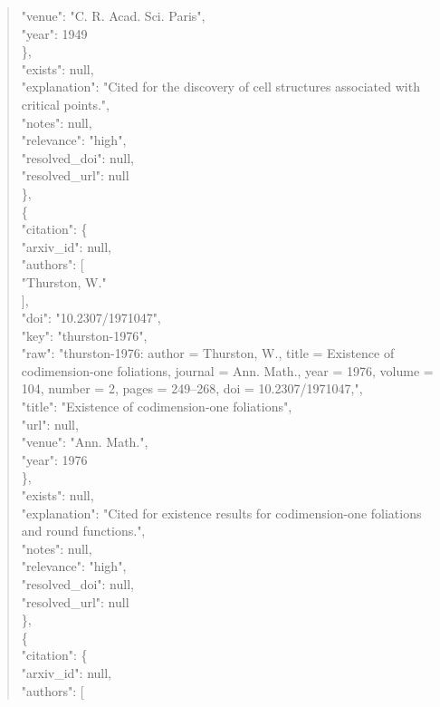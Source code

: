 \documentclass[11pt]{article}
\begin{document}
\begin{quote}
        "venue": "C. R. Acad. Sci. Paris",\\
        "year": 1949\\
      \},\\
      "exists": null,\\
      "explanation": "Cited for the discovery of cell structures associated with critical points.",\\
      "notes": null,\\
      "relevance": "high",\\
      "resolved\_doi": null,\\
      "resolved\_url": null\\
    \},\\
    \{\\
      "citation": \{\\
        "arxiv\_id": null,\\
        "authors": [\\
          "Thurston, W."\\
        ],\\
        "doi": "10.2307/1971047",\\
        "key": "thurston-1976",\\
        "raw": "thurston-1976: author = Thurston, W., title = Existence of codimension-one foliations, journal = Ann. Math., year = 1976, volume = 104, number = 2, pages = 249--268, doi = 10.2307/1971047,",\\
        "title": "Existence of codimension-one foliations",\\
        "url": null,\\
        "venue": "Ann. Math.",\\
        "year": 1976\\
      \},\\
      "exists": null,\\
      "explanation": "Cited for existence results for codimension-one foliations and round functions.",\\
      "notes": null,\\
      "relevance": "high",\\
      "resolved\_doi": null,\\
      "resolved\_url": null\\
    \},\\
    \{\\
      "citation": \{\\
        "arxiv\_id": null,\\
        "authors": [\\

\end{quote}
\end{document}
